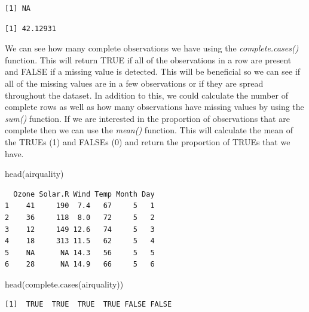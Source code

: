 \documentclass[
  letterpaper,
  DIV=11,
  numbers=noendperiod]{scrreprt}
\newenvironment{Shaded}{\begin{snugshade}}{\end{snugshade}}
\newcommand{\AttributeTok}[1]{\textcolor[rgb]{0.40,0.45,0.13}{#1}}
\newcommand{\ConstantTok}[1]{\textcolor[rgb]{0.56,0.35,0.01}{#1}}
\newcommand{\FunctionTok}[1]{\textcolor[rgb]{0.28,0.35,0.67}{#1}}
\newcommand{\NormalTok}[1]{\textcolor[rgb]{0.00,0.23,0.31}{#1}}
\newcommand{\SpecialCharTok}[1]{\textcolor[rgb]{0.37,0.37,0.37}{#1}}
\begin{document}
\begin{verbatim}
[1] NA
\end{verbatim}

\begin{Shaded}
\end{Shaded}

\begin{verbatim}
[1] 42.12931
\end{verbatim}

We can see how many complete observations we have using the
\emph{complete.cases()} function. This will return TRUE if all of the
observations in a row are present and FALSE if a missing value is
detected. This will be beneficial so we can see if all of the missing
values are in a few observations or if they are spread throughout the
dataset. In addition to this, we could calculate the number of complete
rows as well as how many observations have missing values by using the
\emph{sum()} function. If we are interested in the proportion of
observations that are complete then we can use the \emph{mean()}
function. This will calculate the mean of the TRUEs (1) and FALSEs (0)
and return the proportion of TRUEs that we have.

\begin{Shaded}
\begin{Highlighting}[]
\FunctionTok{head}\NormalTok{(airquality)}
\end{Highlighting}
\end{Shaded}

\begin{verbatim}
  Ozone Solar.R Wind Temp Month Day
1    41     190  7.4   67     5   1
2    36     118  8.0   72     5   2
3    12     149 12.6   74     5   3
4    18     313 11.5   62     5   4
5    NA      NA 14.3   56     5   5
6    28      NA 14.9   66     5   6
\end{verbatim}

\begin{Shaded}
\begin{Highlighting}[]
\FunctionTok{head}\NormalTok{(}\FunctionTok{complete.cases}\NormalTok{(airquality))}
\end{Highlighting}
\end{Shaded}

\begin{verbatim}
[1]  TRUE  TRUE  TRUE  TRUE FALSE FALSE
\end{verbatim}
\end{document}
